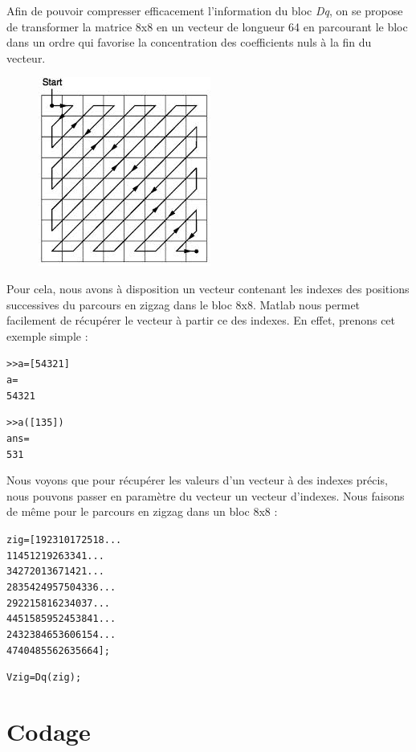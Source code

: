 \documentclass[a4paper, 12pt]{article}
\begin{document}
Afin de pouvoir compresser efficacement l’information du bloc \textit{Dq}, on se propose de transformer la matrice 8x8 en un vecteur de longueur 64 en parcourant le bloc dans un ordre qui favorise la concentration des coefficients nuls à la fin du vecteur.\\

\begin{figure}[h]
	\centering
		\includegraphics[scale=0.5]{zigzag.jpg}
	\label{fig:zigzag}
\end{figure}


Pour cela, nous avons à disposition un vecteur contenant les indexes des positions successives du parcours en zigzag dans le bloc 8x8. Matlab nous permet facilement de récupérer le vecteur à partir ce des indexes. En effet, prenons cet exemple simple : 

\begin{alltt}
>> a = [5 4 3 2 1]
a =
     5     4     3     2     1

>> a([1 3 5])
ans =
     5     3     1
\end{alltt}

Nous voyons que pour récupérer les valeurs d'un vecteur à des indexes précis, nous pouvons passer en paramètre du vecteur un vecteur d'indexes. Nous faisons de même pour le parcours en zigzag dans un bloc 8x8 :

\begin{alltt}
zig=[1 9 2 3 10 17 25 18 ...
     11 4 5 12 19 26 33 41 ...
     34 27 20 13 6 7 14 21 ...
     28 35 42 49 57 50 43 36 ...
     29 22 15 8 16 23 40 37 ...
     44 51 58 59 52 45 38 41 ...
     24 32 38 46 53 60 61 54 ...
     47 40 48 55 62 63 56 64];

Vzig=Dq(zig);
\end{alltt}


\section{Codage}
\end{document}
